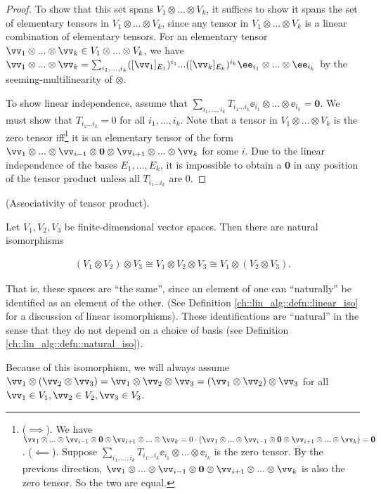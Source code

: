 \begin{proof}      
      To show that this set spans $V_1 \otimes ... \otimes V_k$, it suffices to show it spans the set of elementary tensors in $V_1 \otimes ... \otimes V_k$, since any tensor in $V_1 \otimes ... \otimes V_k$ is a linear combination of elementary tensors. For an elementary tensor $\vv_1 \otimes ... \otimes \vv_k \in V_1 \otimes ... \otimes V_k$, we have $\vv_1 \otimes ... \otimes \vv_k = \sum_{i_1, ..., i_k} ([\vv_1]_{E_1})^{i_1} ... ([\vv_k]_{E_k})^{i_k} \ee_{i_1} \otimes ... \otimes \ee_{i_k}$ by the seeming-multilinearity of $\otimes$.
      
      To show linear independence, assume that $\sum_{i_1, ..., i_k} T_{i_1 ... i_k} \ee_{i_1} \otimes ... \otimes \ee_{i_k} = \mathbf{0}$. We must show that $T_{i_1 ... i_k} = 0$ for all $i_1, ..., i_k$. Note that a tensor in $V_1 \otimes ... \otimes V_k$ is the zero tensor iff\footnote{($\implies$). We have $\vv_1 \otimes ... \otimes \vv_{i - 1} \otimes \mathbf{0} \otimes \vv_{i + 1} \otimes ... \otimes \vv_k = 0 \cdot (\vv_1 \otimes ... \otimes \vv_{i - 1} \otimes \mathbf{0} \otimes \vv_{i + 1} \otimes ... \otimes \vv_k) = \mathbf{0}$. ($\impliedby$). Suppose $\sum_{i_1, ..., i_k} T_{i_1 ... i_k} \ee_{i_1} \otimes ... \otimes \ee_{i_k}$ is the zero tensor. By the previous direction, $\vv_1 \otimes ... \otimes \vv_{i - 1} \otimes \mathbf{0} \otimes \vv_{i + 1} \otimes ... \otimes \vv_k$ is also the zero tensor. So the two are equal.} it is an elementary tensor of the form $\vv_1 \otimes ... \otimes \vv_{i - 1} \otimes \mathbf{0} \otimes \vv_{i + 1} \otimes ... \otimes \vv_k$ for some $i$. Due to the linear independence of the bases $E_1, ..., E_k$, it is impossible to obtain a $\mathbf{0}$ in any position of the tensor product unless all $T_{i_1 ... i_k}$ are $0$.
\end{proof}

\begin{theorem}
    \label{ch::motivated_intro::thm::tensor_product_associative}
    (Associativity of tensor product). 
    
    Let $V_1, V_2, V_3$ be finite-dimensional vector spaces. Then there are natural isomorphisms
    
    \begin{align*}
        (V_1 \otimes V_2) \otimes V_3 \cong V_1 \otimes V_2 \otimes V_3 \cong V_1 \otimes (V_2 \otimes V_3).
    \end{align*}
    
    That is, these spaces are ``the same'', since an element of one can ``naturally'' be identified as an element of the other. (See Definition \ref{ch::lin_alg::defn::linear_iso} for a discussion of linear isomorphisms). These identifications are ``natural'' in the sense that they do not depend on a choice of basis (see Definition \ref{ch::lin_alg::defn::natural_iso}).

    Because of this isomorphism, we will always assume $\vv_1 \otimes (\vv_2 \otimes \vv_3) = \vv_1 \otimes \vv_2 \otimes \vv_3 = (\vv_1 \otimes \vv_2) \otimes \vv_3$ for all $\vv_1 \in V_1, \vv_2 \in V_2, \vv_3 \in V_3$.
\end{theorem}

